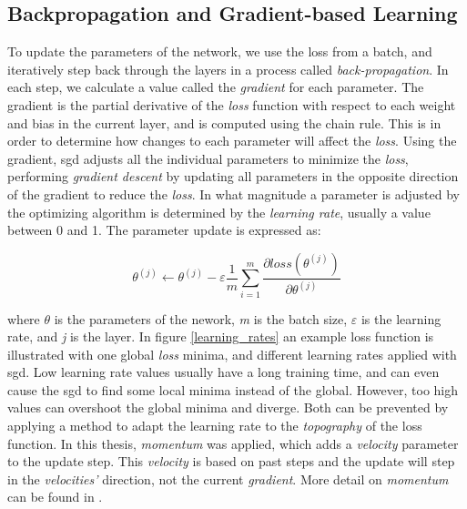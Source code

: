 \subsection{Backpropagation and Gradient-based Learning}
    To update the parameters of the network, we use the loss from a batch, and iteratively step back through the layers in a process called \textit{back-propagation}\cite{rumelhart1986learning_backprop}. In each step, we calculate a value called the \textit{gradient} for each parameter. The gradient is the partial derivative of the \textit{loss} function with respect to each weight and bias in the current layer, and is computed using the chain rule. This is in order to determine how changes to each parameter will affect the \textit{loss}. Using the gradient, \gls{sgd} adjusts all the individual parameters to minimize the \textit{loss}, performing \textit{gradient descent}\cite{Goodfellow-et-al-2016_gradient_descent} by updating all parameters in the opposite direction of the gradient to reduce the \textit{loss}. In what magnitude a parameter is adjusted by the optimizing algorithm is determined by the \textit{learning rate}, usually a value between 0 and 1. The parameter update is expressed as\cite{pmlr-v37-ioffe15_batch_norm}:
    
    \begin{equation}
    \theta^{(j)} \leftarrow \theta^{(j)} - \varepsilon \dfrac{1}{m}\sum_{i=1}^{m} \dfrac{\partial loss (\theta^{(j)})}{\partial \theta^{(j)}}
    \end{equation}
    
    where $\theta$ is the parameters of the nework, \textit{m} is the batch size, $\varepsilon$ is the learning rate, and \textit{j} is the layer. In figure \ref{learning_rates} an example loss function is illustrated with one global \textit{loss} minima, and different learning rates applied with \gls{sgd}. Low learning rate values usually have a long training time, and can even cause the \gls{sgd} to find some local minima instead of the global\cite{farsal2018deep}. However, too high values can overshoot the global minima and diverge. Both can be prevented by applying a method to adapt the learning rate to the \textit{topography} of the loss function. In this thesis, \textit{momentum} was applied, which adds a \textit{velocity} parameter to the update step. This \textit{velocity} is based on past steps and the update will step in the \textit{velocities'} direction, not the current \textit{gradient}. More detail on \textit{momentum} can be found in \citeauthor{pmlr-v28-sutskever13}\cite{pmlr-v28-sutskever13}.
    

